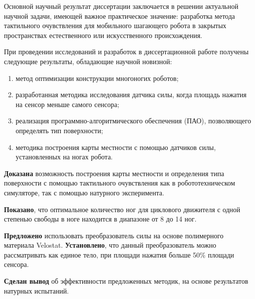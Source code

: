
Основной  научный  результат  диссертации  заключается  в  решении  актуальной 
научной  задачи,  имеющей  важное  практическое  значение: разработка метода тактильного очувствления для мобильного шагающего робота в закрытых пространствах естественного или искусственного происхождения. 

При  проведении  исследований  и  разработок  в  диссертационной  работе  получены 
следующие результаты, обладающие научной новизной:
\begin{enumerate}
  \item метод оптимизации конструкции многоногих роботов;
  \item разработанная методика исследования датчика силы, когда площадь нажатия на сенсор меньше самого сенсора;
  \item реализация программно-алгоритмического обеспечения (ПАО), позволяющего определять тип поверхности;
  \item методика построения карты местности с помощью датчиков силы, установленных на ногах робота.
\end{enumerate}

\textbf{Доказана} возможность построения карты местности и определения типа поверхности с помощью тактильного очувствления как в робототехническом симуляторе, так с помощью натурного эксперимента.

\textbf{Показано}, что оптимальное количество ног для циклового движителя с одной степенью свободы в ноге находится в диапазоне от 8 до 14 ног. 

\textbf{Предложено} использовать преобразователь силы на основе полимерного материала Velostat. \textbf{Установлено}, что данный преобразователь можно рассматривать как единое тело, при площади нажатия больше 50\% площади сенсора. 

\textbf{Сделан вывод} об эффективности предложенных методик, на основе результатов натурных испытаний.